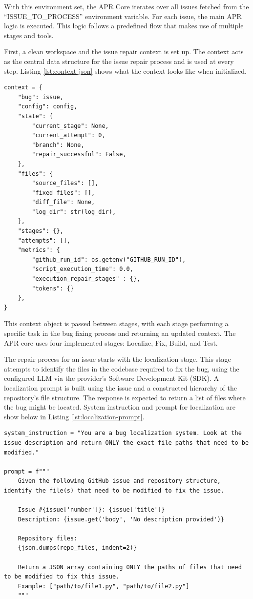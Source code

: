 With this environment set, the APR Core iterates over all issues fetched from the ``ISSUE\_TO\_PROCESS'' environment variable. For each issue, the main APR logic is executed. This logic follows a predefined flow that makes use of multiple stages and tools.

First, a clean workspace and the issue repair context is set up. The context acts as the central data structure for the issue repair process and is used at every step. Listing \ref{lst:context-json} shows what the context looks like when initialized.

\begin{lstlisting}[style=json, caption={Context JSON}, label={lst:context-json}]  
context = {
    "bug": issue,
    "config": config,
    "state": {
        "current_stage": None,
        "current_attempt": 0,
        "branch": None,
        "repair_successful": False,
    },
    "files": {
        "source_files": [],
        "fixed_files": [],
        "diff_file": None,
        "log_dir": str(log_dir),
    },
    "stages": {},
    "attempts": [],
    "metrics": {
        "github_run_id": os.getenv("GITHUB_RUN_ID"),
        "script_execution_time": 0.0,
        "execution_repair_stages" : {},
        "tokens": {}
    },
}
\end{lstlisting}

This context object is passed between stages, with each stage performing a specific task in the bug fixing process and returning an updated context. The APR core uses four implemented stages: Localize, Fix, Build, and Test.

The repair process for an issue starts with the localization stage. This stage attempts to identify the files in the codebase required to fix the bug, using the configured \ac{LLM} via the provider's Software Development Kit (SDK). A localization prompt is built using the issue and a constructed hierarchy of the repository's file structure. The response is expected to return a list of files where the bug might be located. System instruction and prompt for localization are show below in Listing \ref{lst:localization-prompt}.

\vspace{3.9cm}

\begin{lstlisting}[style=python, caption={Localization Prompt}, label={lst:localization-prompt}]
system_instruction = "You are a bug localization system. Look at the issue description and return ONLY the exact file paths that need to be modified."

prompt = f"""
    Given the following GitHub issue and repository structure, identify the file(s) that need to be modified to fix the issue.

    Issue #{issue['number']}: {issue['title']}
    Description: {issue.get('body', 'No description provided')}

    Repository files:
    {json.dumps(repo_files, indent=2)}

    Return a JSON array containing ONLY the paths of files that need to be modified to fix this issue.
    Example: ["path/to/file1.py", "path/to/file2.py"]
    """
\end{lstlisting}

